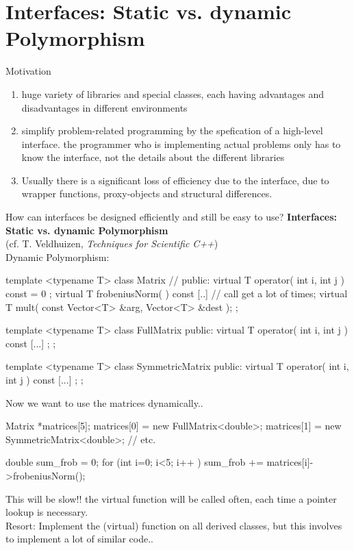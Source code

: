 \section{Interfaces: Static vs. dynamic Polymorphism}

Motivation
\begin{enumerate}
\item huge variety of libraries and special classes, each having
advantages and disadvantages in different environments
\item simplify problem-related programming by the spefication
  of a high-level interface. the programmer who is implementing
actual problems only has to know the interface, not the details
about the different libraries
\item Usually there is a significant loss of efficiency due to the interface,
 due to wrapper functions, proxy-objects and structural differences.
\end{enumerate}

How can interfaces be designed efficiently and still be easy to use?
{\bf Interfaces: Static vs. dynamic Polymorphism} \\
(cf. T. Veldhuizen, {\em Techniques for Scientific C++})\\
{Dynamic Polymorphism:}
\begin{myverbatim}
template <typename T> class Matrix { //
public:
  virtual T operator( int i, int j ) const = 0 { };
  virtual T frobeniusNorm( ) const { [..] // call get a lot of times; }
  virtual T mult( const Vector<T> &arg, Vector<T> &dest );
};

template <typename T> class FullMatrix {
public:
  virtual T operator( int i, int j ) const { [...] };
};

template <typename T> class SymmetricMatrix {
public:
  virtual T operator( int i, int j ) const { [...] };
};
\end{myverbatim}

Now we want to use the matrices dynamically..
\begin{myverbatim}
Matrix *matrices[5];
matrices[0] = new FullMatrix<double>;
matrices[1] = new SymmetricMatrix<double>;
// etc.

double sum_frob = 0;
for (int i=0; i<5; i++ ) {
  sum_frob += matrices[i]->frobeniusNorm();
}
\end{myverbatim}

{This will be slow!!} the virtual function  will be called
often, each time a pointer lookup is necessary. \\
Resort: Implement the (virtual) function  on all derived classes,
but this involves to implement a lot of similar code..

